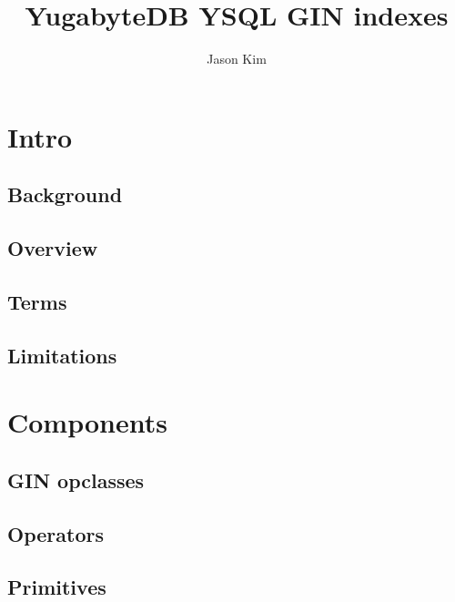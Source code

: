 \documentclass[11pt]{article}
\title{YugabyteDB YSQL GIN indexes}
\author{
    Jason Kim
}
\begin{document}
\maketitle
\tableofcontents

\newpage
\hypertarget{intro}{%
\section{Intro}\label{intro}}

\hypertarget{background}{%
\subsection{Background}\label{background}}


\hypertarget{overview}{%
\subsection{Overview}\label{overview}}


\hypertarget{terms}{%
\subsection{Terms}\label{terms}}


\hypertarget{limitations}{%
\subsection{Limitations}\label{limitations}}


\newpage
\hypertarget{components}{%
\section{Components}\label{components}}

\hypertarget{gin-opclasses}{%
\subsection{GIN opclasses}\label{gin-opclasses}}


\hypertarget{operators}{%
\subsection{Operators}\label{operators}}


\hypertarget{primitives}{%
\subsection{Primitives}\label{primitives}}

\end{document}
